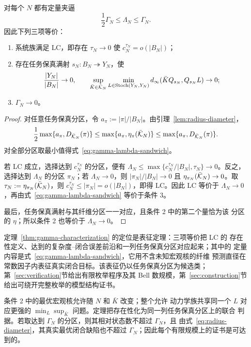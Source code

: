 \begin{theorem}[压缩--闭合联合指标的表征定理]
\label{thm:gamma-characterization}
对每个 $N$ 都有定量夹逼
\begin{equation}
\frac12\Gamma_N\le\Lambda_N\le\Gamma_N.
\label{eq:gamma-lambda-sandwich}
\end{equation}
因此下列三项等价：
\begin{enumerate}
  \item 系统族满足 LC，即存在 $\tau_N\to0$ 使
  $c_N^{\tau_N}=o(|B_N|)$；
  \item 存在任务保真满射 $s_N:B_N\twoheadrightarrow Y_N$，使
  \[
  \frac{|Y_N|}{|B_N|}\to0,
  \qquad
  \sup_{\bar K\in\bar{\mathcal K}_N}
  \min_{L\in\operatorname{Stoch}(Y_N,Y_N)}
  d_\infty(\bar KQ_{s_N},Q_{s_N}L)\to0;
  \]
  \item $\Gamma_N\to0$。
\end{enumerate}
\end{theorem}

\begin{proof}
对任意任务保真分区，令
$a_\pi:=|\pi|/|B_N|$。由引理~\ref{lem:radius-diameter}，
\[
\frac12\max\{a_\pi,D_{\bar{\mathcal K}_N}(\pi)\}
\le
\max\{a_\pi,\eta_\pi(\bar{\mathcal K}_N)\}
\le
\max\{a_\pi,D_{\bar{\mathcal K}_N}(\pi)\}.
\]
对全部分区取最小值得式~\eqref{eq:gamma-lambda-sandwich}。

若 LC 成立，选择达到 $c_N^{\tau_N}$ 的分区，便有
$\Lambda_N\le\max\{c_N^{\tau_N}/|B_N|,\tau_N\}\to0$。反之，选择达到
$\Lambda_N$ 的分区 $\pi_N$；若 $\Lambda_N\to0$，则
$|\pi_N|/|B_N|\to0$ 且
$\eta_{\pi_N}(\bar{\mathcal K}_N)\to0$。取
$\tau_N:=\eta_{\pi_N}(\bar{\mathcal K}_N)$，则
$c_N^{\tau_N}\le|\pi_N|=o(|B_N|)$，即得 LC。因此 LC 等价于
$\Lambda_N\to0$，再由式~\eqref{eq:gamma-lambda-sandwich} 等价于条件 3。

最后，任务保真满射与其纤维分区一一对应，且条件 2 中的第二个量恰为该
分区的 $\eta$；所以条件 2 也等价于 $\Lambda_N\to0$。
\end{proof}

定理~\ref{thm:gamma-characterization} 的定位是表征定理：三项等价把 LC 的
存在性定义、达到的复杂度--闭合误差前沿和一列任务保真分区对应起来；其中的
定量内容是式~\eqref{eq:gamma-lambda-sandwich}，它用不含未知宏观核的纤维
预测直径在常数因子内表征真实闭合目标。该表征仍以任务保真分区为候选类；
第~\ref{sec:verification}节给出有限枚举程序及其 Bell 数规模，第~\ref{sec:construction}节
给出可绕开完整枚举的模型结构证书。

条件 2 中的最优宏观核允许随 $N$ 和 $\bar K$ 改变；整个允许
动力学族共享同一个 $L$ 对应更强的 $\min_L\sup_{\bar K}$ 问题。定理把存在性化为同一列任务保真分区上的联合
判据。若取达到 $\Gamma_N$ 的分区，则其相对状态数不超过 $\Gamma_N$，且
由式~\eqref{eq:radius-diameter}，其真实最优闭合缺陷也不超过
$\Gamma_N$；因此每个有限规模上的证书是可达到的。

